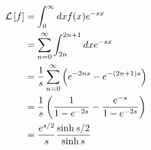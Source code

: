 \item

\begin{align*}
    \mathcal{L}\left[ f \right]
    &= \int_0^\infty dx f(x) e^{-sx} \\
    &= \sum_{n=0}^\infty \int_{2n}^{2n+1} dx e^{-sx} \\
    &= \frac{1}{s} \sum_{n=0}^\infty \left( e^{-2ns} - e^{-(2n+1)s} \right) \\
    &= \frac{1}{s} \left( \frac{1}{1 - e^{-2s}} - \frac{e^{-s}}{1 - e^{-2s}} \right) \\
    &= \frac{e^{s/2}}{s} \frac{\sinh s/2}{\sinh s}
\end{align*}
